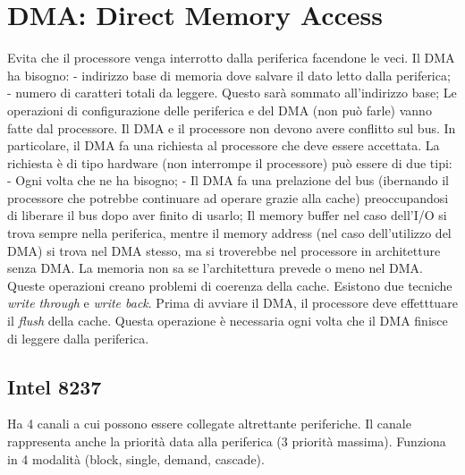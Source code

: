 \documentclass{article}
\begin{document}
\section{DMA: Direct Memory Access}
Evita che il processore venga interrotto dalla periferica facendone le veci.
Il DMA ha bisogno:
- indirizzo base di memoria dove salvare il dato letto dalla periferica;
- numero di caratteri totali da leggere. Questo sarà sommato all'indirizzo 
base;
Le operazioni di configurazione delle periferica e del DMA (non può farle) vanno
fatte dal processore. Il DMA e il processore non devono avere conflitto sul bus.
In particolare, il DMA fa una richiesta al processore che deve essere accettata.
La richiesta è di tipo hardware (non interrompe il processore) può essere di due tipi:
- Ogni volta che ne ha bisogno;
- Il DMA fa una prelazione del bus (ibernando il processore che potrebbe 
continuare ad operare grazie alla cache) preoccupandosi di liberare il bus dopo 
aver finito di usarlo;
Il memory buffer nel caso dell'I/O si trova sempre nella periferica, mentre 
il memory address (nel caso dell'utilizzo del DMA) si trova nel DMA stesso, ma 
si troverebbe nel processore in architetture senza DMA. La memoria non sa se 
l'architettura prevede o meno nel DMA.\\ 
Queste operazioni creano problemi di coerenza della cache. Esistono due tecniche 
\textit{write through} e \textit{write back}. Prima di avviare il DMA, il
processore deve effetttuare il \textit{flush} della cache. Questa operazione 
è necessaria ogni volta che il DMA finisce di leggere dalla periferica.

\subsection{Intel 8237}
Ha 4 canali a cui possono essere collegate altrettante periferiche. Il canale 
rappresenta anche la priorità data alla periferica (3 priorità massima).
Funziona in 4 modalità (block, single, demand, cascade).
\end{document}
